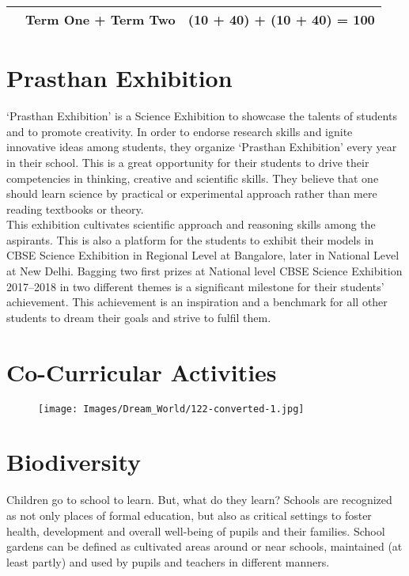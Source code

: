 \begin{table}[H]
\begin{tabular}{|c|c|c|c|c|c|c|}
\multicolumn{1}{|c|}{}                   & \multicolumn{2}{c|}{\textbf{Term One + Term Two}}                                                                                                                                                                    & \multicolumn{4}{c|}{(10 + 40) + (10 + 40) = 100}                                                                                                                                                                                                                                          \\ \hline
\end{tabular}
\end{table}


\normalsize
\section{Prasthan Exhibition}
‘Prasthan Exhibition’ is a Science Exhibition to showcase the talents of students and to promote creativity. In order to endorse research skills and ignite innovative ideas among students, they organize ‘Prasthan Exhibition’ every year in their school. This is a great opportunity for their students to drive their competencies in thinking, creative and scientific skills. They believe that one should learn science by practical or experimental approach rather than mere reading textbooks or theory.\\

This exhibition cultivates scientific approach and reasoning skills among the aspirants. This is also a platform for the students to exhibit their models in CBSE Science Exhibition in Regional Level at Bangalore, later in National Level at New Delhi. Bagging two first prizes at National level CBSE Science Exhibition 2017–2018 in two different themes is a significant milestone for their students’ achievement. This achievement is an inspiration and a benchmark for all other students to dream their goals and strive to fulfil them.
\section{Co-Curricular Activities}
\begin{figure}[H]
    \centering
    \texttt{[image: Images/Dream\_World/122-converted-1.jpg]}
\end{figure}
\section{Biodiversity}
Children go to school to learn. But, what do they learn? Schools are recognized as not only places of formal education, but also as critical settings to foster health, development and overall well-being of pupils and their families. School gardens can be defined as cultivated areas around or near schools, maintained (at least partly) and used by pupils and teachers in different manners.\\

